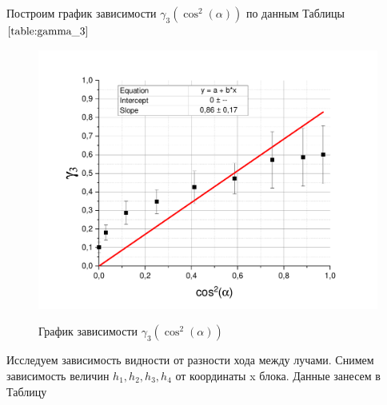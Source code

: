\documentclass[a4paper,12pt]{article}
\begin{document}
Построим график зависимости $\gamma_3(\cos^2(\alpha))$ по данным Таблицы $\ref{table:gamma_3}$

\begin{figure}[h!]
	\begin{center}
	\includegraphics[scale=0.7]{graph1}
	\label{fig:graph1}
	\caption{График зависимости $\gamma_3(\cos^2(\alpha))$}
	\end{center}
\end{figure}

Исследуем зависимость видности от разности хода между лучами. Снимем зависимость величин $h_1, h_2, h_3, h_4$ от координаты x блока. Данные занесем в Таблицу 

\newpage
\end{document}

